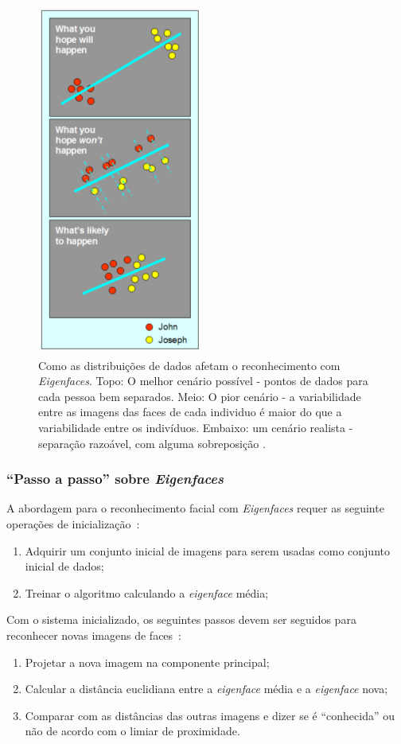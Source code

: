 	\begin{figure}[H]
		\begin{center}
			\includegraphics[scale=6.0]{figuras/2.FundamentacaoTeorica/espacoPCA.png}
		\end{center}
		\caption{Como as distribuições de dados afetam o reconhecimento com \textit{Eigenfaces}. Topo: O melhor cenário possível - pontos de dados para cada pessoa bem separados. Meio: O pior cenário - a variabilidade entre as imagens das faces de cada individuo é maior do que a variabilidade entre os indivíduos. Embaixo: um cenário realista - separação razoável, com alguma sobreposição \cite{hewitt}.}
		\label{exemploEspacoPCA}
	\end{figure}

\subsubsection{``Passo a passo'' sobre \textit{Eigenfaces}}

A abordagem para o reconhecimento facial com \textit{Eigenfaces} requer as seguinte operações de inicialização~\cite{turk}:

	\begin{enumerate}
		\item Adquirir um conjunto inicial de imagens para serem usadas como conjunto inicial de dados;
		\item Treinar o algoritmo calculando a \textit{eigenface} média;
	\end{enumerate}

Com o sistema inicializado, os seguintes passos devem ser seguidos para reconhecer novas imagens de faces~\cite{turk}:
	
	\begin{enumerate}
		\item Projetar a nova imagem na componente principal;
		\item Calcular a distância euclidiana entre a \textit{eigenface} média e a \textit{eigenface} nova;
		\item Comparar com as distâncias das outras imagens e dizer se é ``conhecida'' ou não de acordo com o limiar de proximidade.
	\end{enumerate}
